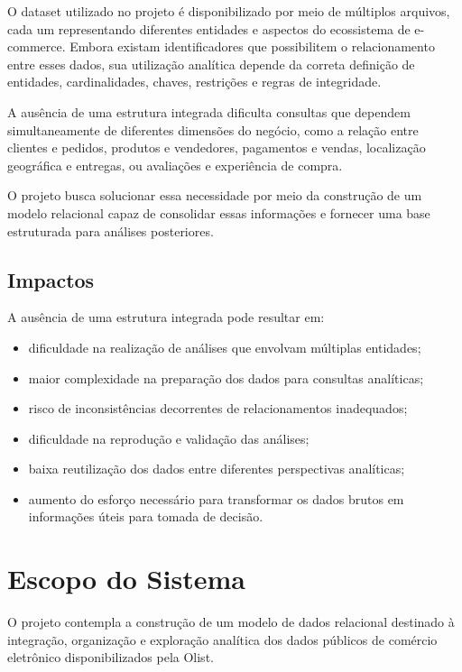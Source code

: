 \documentclass[12pt,a4paper]{article}
\begin{document}
O dataset utilizado no projeto é disponibilizado por meio de múltiplos arquivos, cada um representando diferentes entidades e aspectos do ecossistema de e-commerce. Embora existam identificadores que possibilitem o relacionamento entre esses dados, sua utilização analítica depende da correta definição de entidades, cardinalidades, chaves, restrições e regras de integridade.

A ausência de uma estrutura integrada dificulta consultas que dependem simultaneamente de diferentes dimensões do negócio, como a relação entre clientes e pedidos, produtos e vendedores, pagamentos e vendas, localização geográfica e entregas, ou avaliações e experiência de compra.

O projeto busca solucionar essa necessidade por meio da construção de um modelo relacional capaz de consolidar essas informações e fornecer uma base estruturada para análises posteriores.

\subsection{Impactos}

A ausência de uma estrutura integrada pode resultar em:

\begin{itemize}
    \item dificuldade na realização de análises que envolvam múltiplas entidades;
    \item maior complexidade na preparação dos dados para consultas analíticas;
    \item risco de inconsistências decorrentes de relacionamentos inadequados;
    \item dificuldade na reprodução e validação das análises;
    \item baixa reutilização dos dados entre diferentes perspectivas analíticas;
    \item aumento do esforço necessário para transformar os dados brutos em informações úteis para tomada de decisão.
\end{itemize}

\section{Escopo do Sistema}

O projeto contempla a construção de um modelo de dados relacional destinado à integração, organização e exploração analítica dos dados públicos de comércio eletrônico disponibilizados pela Olist.
\end{document}
